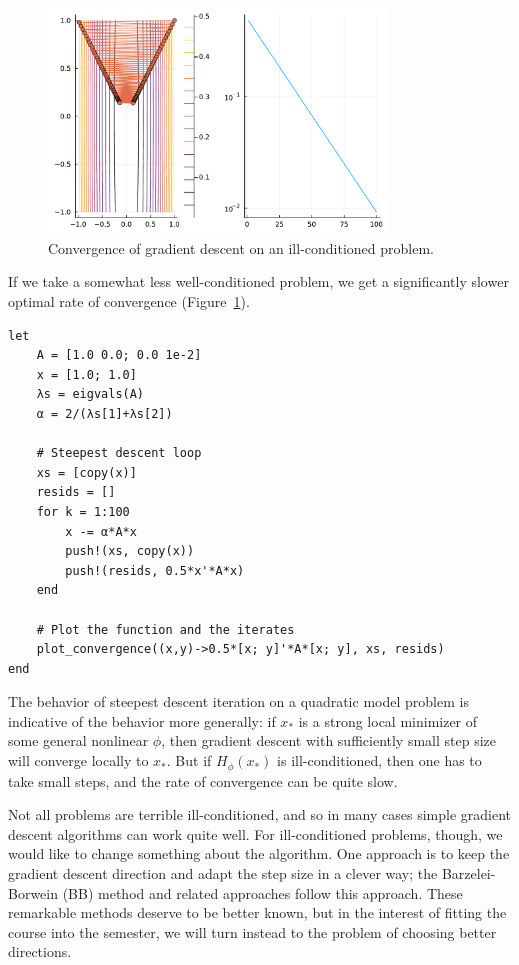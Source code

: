 \documentclass[12pt, leqno]{article} %
\begin{document}
\begin{figure}
\begin{center}
  \includegraphics[width=0.8\textwidth]{fig/2023-03-31-gradient-bad.pdf}
\end{center}
\caption{Convergence of gradient descent on an ill-conditioned problem.}
\label{fig:gradient-bad}
\end{figure}

If we take a somewhat less well-conditioned problem, we get a
significantly slower optimal rate of convergence
(Figure~\ref{fig:gradient-bad}).

\begin{verbatim}
let
    A = [1.0 0.0; 0.0 1e-2]
    x = [1.0; 1.0]
    λs = eigvals(A)
    α = 2/(λs[1]+λs[2])

    # Steepest descent loop
    xs = [copy(x)]
    resids = []
    for k = 1:100
        x -= α*A*x
        push!(xs, copy(x))
        push!(resids, 0.5*x'*A*x)
    end

    # Plot the function and the iterates
    plot_convergence((x,y)->0.5*[x; y]'*A*[x; y], xs, resids)
end
\end{verbatim}

The behavior of steepest descent iteration on a quadratic model problem
is indicative of the behavior more generally: if \(x_*\) is a strong
local minimizer of some general nonlinear \(\phi\), then gradient
descent with sufficiently small step size will converge locally to
\(x_*\). But if \(H_{\phi}(x_*)\) is ill-conditioned, then one has to
take small steps, and the rate of convergence can be quite slow.

Not all problems are terrible ill-conditioned, and so in many cases
simple gradient descent algorithms can work quite well. For
ill-conditioned problems, though, we would like to change something
about the algorithm. One approach is to keep the gradient descent
direction and adapt the step size in a clever way; the Barzelei-Borwein
(BB) method and related approaches follow this approach. These
remarkable methods deserve to be better known, but in the interest of
fitting the course into the semester, we will turn instead to the
problem of choosing better directions.
\end{document}
